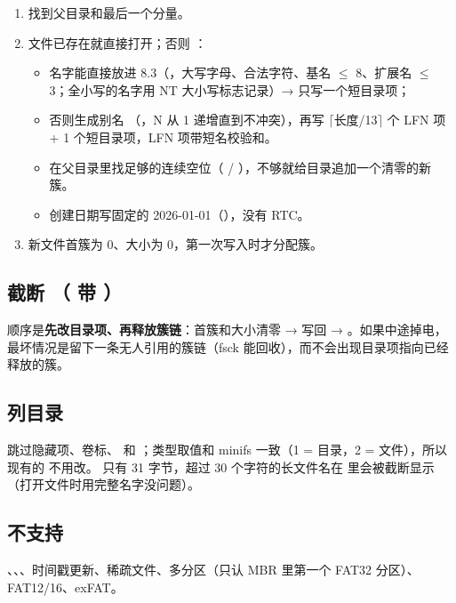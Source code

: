 \begin{enumerate}
  \item {} 找到父目录和最后一个分量。
  \item 文件已存在就直接打开；否则 ：
    \begin{itemize}
      \item 名字能直接放进 8.3（，大写字母、合法字符、基名 $\leq$ 8、扩展名 $\leq$ 3；全小写的名字用 NT 大小写标志记录）→ 只写一个短目录项；
      \item 否则生成别名 （，N 从 1 递增直到不冲突），再写 $\lceil$长度/13$\rceil$ 个 LFN 项 + 1 个短目录项，LFN 项带短名校验和。
      \item {} 在父目录里找足够的连续空位（ / ），不够就给目录追加一个清零的新簇。
      \item 创建日期写固定的 2026-01-01（），没有 RTC。
    \end{itemize}
  \item 新文件首簇为 0、大小为 0，第一次写入时才分配簇。
\end{enumerate}

\subsection{截断 （ 带 ）}

顺序是\textbf{先改目录项、再释放簇链}：首簇和大小清零 →  写回 → 。如果中途掉电，最坏情况是留下一条无人引用的簇链（fsck 能回收），而不会出现目录项指向已经释放的簇。

\subsection{列目录 }

跳过隐藏项、卷标、 和 ；类型取值和 minifs 一致（1 = 目录，2 = 文件），所以现有的  不用改。 只有 31 字节，超过 30 个字符的长文件名在  里会被截断显示（打开文件时用完整名字没问题）。

\subsection{不支持}

、、、时间戳更新、稀疏文件、多分区（只认 MBR 里第一个 FAT32 分区）、FAT12/16、exFAT。

